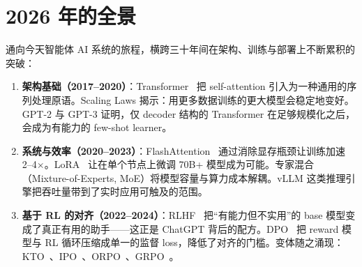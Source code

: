 \documentclass[11pt,a4paper,openany]{book}
\begin{document}
\section*{2026 年的全景}
\label{the-landscape-in-2026}

通向今天智能体 AI 系统的旅程，横跨三十年间在架构、训练与部署上不断累积的突破：

\begin{enumerate}
  \item \textbf{架构基础（2017--2020）}：Transformer~\cite{vaswani2017attention} 把 self-attention 引入为一种通用的序列处理原语。Scaling Laws 揭示：用更多数据训练的更大模型会稳定地变好。GPT-2 与 GPT-3 证明，仅 decoder 结构的 Transformer 在足够规模化之后，会成为有能力的 few-shot learner。
  \item \textbf{系统与效率（2020--2023）}：FlashAttention~\cite{dao2022flashattention} 通过消除显存瓶颈让训练加速 2--4$\times$。LoRA~\cite{hu2022lora} 让在单个节点上微调 70B+ 模型成为可能。专家混合（Mixture-of-Experts, MoE）将模型容量与算力成本解耦。vLLM 这类推理引擎把吞吐量带到了实时应用可触及的范围。
  \item \textbf{基于 RL 的对齐（2022--2024）}：RLHF~\cite{ouyang2022training} 把“有能力但不实用”的 base 模型变成了真正有用的助手——这正是 ChatGPT 背后的配方。DPO~\cite{rafailov2023direct} 把 reward 模型与 RL 循环压缩成单一的监督 loss，降低了对齐的门槛。变体随之涌现：KTO~\cite{ethayarajh2024kto}、IPO~\cite{azar2024general}、ORPO~\cite{hong2024orpo}、GRPO~\cite{shao2024deepseekmath}。

\end{enumerate}
\end{document}
